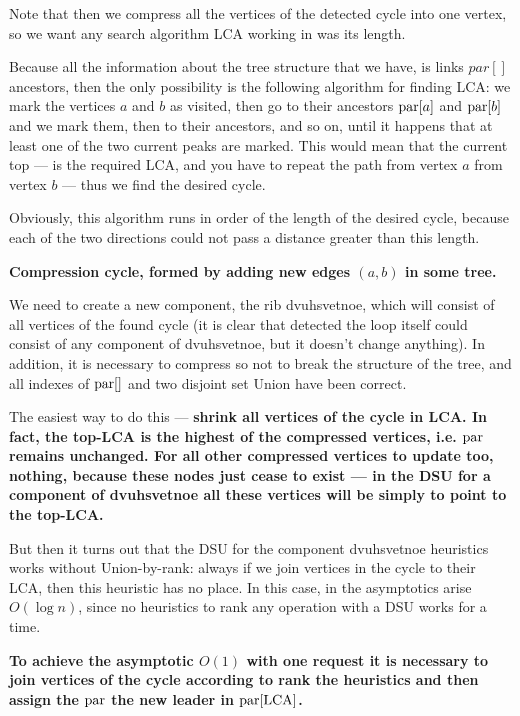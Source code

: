 {Note that then we compress all the vertices of the detected cycle into one vertex, so we want any search algorithm LCA working in was its length.

Because all the information about the tree structure that we have, is links $par[]$ ancestors, then the only possibility is the following algorithm for finding LCA: we mark the vertices $a$ and $b$ as visited, then go to their ancestors ${\rm par}[a]$ and ${\rm par}[b]$ and we mark them, then to their ancestors, and so on, until it happens that at least one of the two current peaks are marked. This would mean that the current top --- is the required LCA, and you have to repeat the path from vertex $a$ from vertex $b$ --- thus we find the desired cycle.

Obviously, this algorithm runs in order of the length of the desired cycle, because each of the two directions could not pass a distance greater than this length.

\li \bf{Compression cycle}, formed by adding new edges $(a,b)$ in some tree.

We need to create a new component, the rib dvuhsvetnoe, which will consist of all vertices of the found cycle (it is clear that detected the loop itself could consist of any component of dvuhsvetnoe, but it doesn't change anything). In addition, it is necessary to compress so not to break the structure of the tree, and all indexes of ${\rm par}[]$ and two disjoint set Union have been correct.

The easiest way to do this --- \bf{shrink all vertices of the cycle in LCA}. In fact, the top-LCA is the highest of the compressed vertices, i.e. ${\rm par}$ remains unchanged. For all other compressed vertices to update too, nothing, because these nodes just cease to exist --- in the DSU for a component of dvuhsvetnoe all these vertices will be simply to point to the top-LCA.

But then it turns out that the DSU for the component dvuhsvetnoe heuristics works without Union-by-rank: always if we join vertices in the cycle to their LCA, then this heuristic has no place. In this case, in the asymptotics arise $O(\log n)$, since no heuristics to rank any operation with a DSU works for a time.

\bf{To achieve the asymptotic $O(1)$} with one request it is necessary to join vertices of the cycle according to rank the heuristics and then assign the ${\rm par}$ the new leader in ${\rm par}[{\rm LCA}]$.

}



